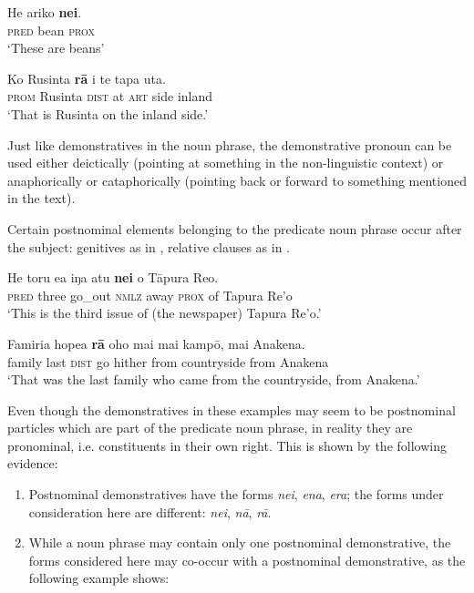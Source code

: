 \ea\label{ex:4.239}
\gll He {\ꞌ}ariko \textbf{nei}. \\
\textsc{pred} bean \textsc{prox} \\

\glt 
‘These are beans’ \textstyleExampleref{[Notes]}
\z

\ea\label{ex:4.240}
\gll Ko Rusinta \textbf{rā} {\ꞌ}i te tapa {\ꞌ}uta. \\
\textsc{prom} Rusinta \textsc{dist} at \textsc{art} side inland \\

\glt
‘That is Rusinta on the inland side.’ \textstyleExampleref{[R411.074]} 
\z

Just like demonstratives in the noun phrase, the demonstrative pronoun can be used either deictically (pointing at something in the non-linguistic context) or anaphorically or cataphorically (pointing back or forward to something mentioned in the text).

Certain postnominal elements belonging to the predicate noun phrase occur after the subject: genitives as in , relative clauses as in . 

\ea\label{ex:4.241}
\gll He toru e{\ꞌ}a iŋa atu \textbf{nei} o Tāpura Re{\ꞌ}o. \\
\textsc{pred} three go\_out \textsc{nmlz} away \textsc{prox} of Tapura Re’o \\

\glt 
‘This is the third issue of (the newspaper) Tapura Re’o.’ \textstyleExampleref{[R649.001]} 
\z

\ea\label{ex:4.242}
\gll Famiria hope{\ꞌ}a \textbf{rā} oho mai mai kampō, mai {\ꞌ}Anakena. \\
family last \textsc{dist} go hither from countryside from Anakena \\

\glt
‘That was the last family who came from the countryside, from Anakena.’ \textstyleExampleref{[R413.889]} 
\z

Even though the demonstratives in these examples may seem to be postnominal particles which are part of the predicate noun phrase, in reality they are pronominal, i.e. constituents in their own right. This is shown by the following evidence:

\begin{enumerate}
\item 
Postnominal demonstratives have the forms \textit{nei}, \textit{ena}, \textit{era}; the forms under consideration here are different: \textit{nei}, \textit{nā}, \textit{rā}.

\item 
While a noun phrase may contain only one postnominal demonstrative, the forms considered here may co-occur with a postnominal demonstrative, as the following example shows:

\end{enumerate}

